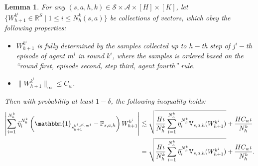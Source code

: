 \documentclass{article}
\newtheorem{lemma}{Lemma}[section]
\begin{document}
\begin{lemma}
    \label{nonmartingale}
    For any $(s,a,h,k) \in \mathcal{S}\times \mathcal{A} \times [H]\times[K]$, let $\{W_{h+1}^{k^i} \in \mathbb{R}^{S} \mid 1 \leq i \leq N_h^k(s,a)\}$ be collections of vectors, which obey the following properties:
\begin{itemize}
    \item $W_{h+1}^{k^i}$ is fully determined by the samples collected up to $h-$th step of $j^i-$th episode of agent $m^i$ in round $k^i$, where the samples is ordered based on the ``round first, episode second, step third, agent fourth” rule.
    \item $\|W_{h+1}^{k^i}\|_\infty \leq C_w$. 
\end{itemize}
Then with probability at least $1-\delta$, the following inequality holds:
\begin{align*}
    \left|\sum_{i=1} ^{N_h^k} \Tilde{\eta}_i^{N_h^k} \left(\mathbbm{1}_{s_{h+1}^{k^i,j^i,m^i}} - \mathbb{P}_{s,a,h}\right)W_{h+1}^{k^i}\right| &\lesssim \sqrt{\frac{H\iota}{N_h^k} \sum_{i=1}^{N_h^k} \eta_i^{N_h^k} \mathbb{V}_{s,a,h}(W_{h+1}^{k^i})} + \frac{HC_w\iota}{N_h^k} \\
    &= \sqrt{\frac{H\iota}{N_h^k} \sum_{i=1}^{N_h^k} \Tilde{\eta}_i^{N_h^k} \mathbb{V}_{s,a,h}(W_{h+1}^{k^i})} + \frac{HC_w\iota}{N_h^k}.
\end{align*}

\end{lemma}
\end{document}
